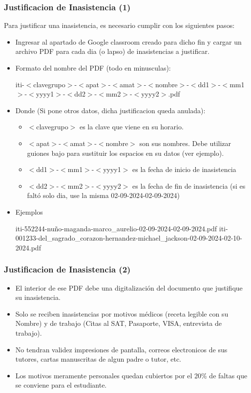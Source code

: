 \begin{frame}
\frametitle{Justificacion de Inasistencia (1)}
Para justificar una inasistencia, es necesario cumplir con los siguientes pasos:
\begin{itemize}	 
\item Ingresar al apartado de Google classroom creado para dicho fin y cargar un archivo PDF para cada dia (o lapso) de inasistencias a justificar. 
\item Formato del nombre del PDF (todo en minusculas):

\tiny{iti-$<$clavegrupo$>$-$<$apat$>$-$<$amat$>$-$<$nombre$>$-$<$dd1$>$-$<$mm1$>$-$<$yyyy1$>$-$<$dd2$>$-$<$mm2$>$-$<$yyyy2$>$.pdf}
\normalsize
\item Donde (Si pone otros datos, dicha justificacion queda anulada):
\begin{itemize}
\item \scriptsize{$<$clavegrupo$>$} es la clave que viene en su horario. 
\item \scriptsize{$<$apat$>$-$<$amat$>$-$<$nombre$>$} son sus nombres.  Debe utilizar guiones bajo para sustituir los espacios en su datos (ver ejemplo). 
\item \scriptsize{$<$dd1$>$-$<$mm1$>$-$<$yyyy1$>$} es la fecha de inicio de inasistencia 
\item \scriptsize{$<$dd2$>$-$<$mm2$>$-$<$yyyy2$>$} es la fecha de fin de inasistencia (si es faltó solo dia, use la misma 02-09-2024-02-09-2024)
\end{itemize}
\item Ejemplos

\scriptsize{iti-552244-nuño-maganda-marco\_aurelio-02-09-2024-02-09-2024.pdf}
\scriptsize{iti-001233-del\_sagrado\_corazon-hernandez-michael\_jackson-02-09-2024-02-10-2024.pdf}
\normalsize
\end{itemize}
\end{frame}

\begin{frame}
\frametitle{Justificacion de Inasistencia (2)}
\begin{itemize}
\item El interior de ese PDF debe una digitalización del documento que justifique su inasistencia.
\item Solo se reciben inasistencias por motivos médicos (receta legible con su Nombre) y de trabajo (Citas al SAT, Pasaporte, VISA, entrevista de trabajo).
\item No tendran validez impresiones de pantalla, correos electronicos de sus tutores, cartas manuscritas de algun padre o tutor, etc.
\item Los motivos meramente personales quedan cubiertos por el 20\% de faltas que se conviene para el estudiante. 
\end{itemize}
\end{frame}




